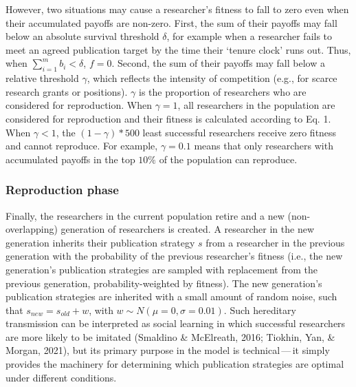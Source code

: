 \documentclass[
  british,
  a4paper,
  ,man,mask,floatsintext]{apa6}
\begin{document}
However, two situations may cause a researcher's fitness to fall to zero even when their accumulated payoffs are non-zero.
First, the sum of their payoffs may fall below an absolute survival threshold \(\delta\), for example when a researcher fails to meet an agreed publication target by the time their `tenure clock' runs out.
Thus, when \(\sum_{i=1}^{m} b_i < \delta\), \(f = 0\).
Second, the sum of their payoffs may fall below a relative threshold \(\gamma\), which reflects the intensity of competition (e.g., for scarce research grants or positions).
\(\gamma\) is the proportion of researchers who are considered for reproduction.
When \(\gamma = 1\), all researchers in the population are considered for reproduction and their fitness is calculated according to Eq. 1.
When \(\gamma < 1\), the \((1 - \gamma)*500\) least successful researchers receive zero fitness and cannot reproduce.
For example, \(\gamma = 0.1\) means that only researchers with accumulated payoffs in the top \(10\%\) of the population can reproduce.

\subsubsection{Reproduction phase}\label{reproduction-phase}

Finally, the researchers in the current population retire and a new (non-overlapping) generation of researchers is created.
A researcher in the new generation inherits their publication strategy \(s\) from a researcher in the previous generation with the probability of the previous researcher's fitness (i.e., the new generation's publication strategies are sampled with replacement from the previous generation, probability-weighted by fitness).
The new generation's publication strategies are inherited with a small amount of random noise, such that \(s_{new} = s_{old} + w\), with \(w \sim N(\mu = 0, \sigma = 0.01)\).
Such hereditary transmission can be interpreted as social learning in which successful researchers are more likely to be imitated (Smaldino \& McElreath, 2016; Tiokhin, Yan, \& Morgan, 2021), but its primary purpose in the model is technical\(\,\)---\(\,\)it simply provides the machinery for determining which publication strategies are optimal under different conditions.
\end{document}
